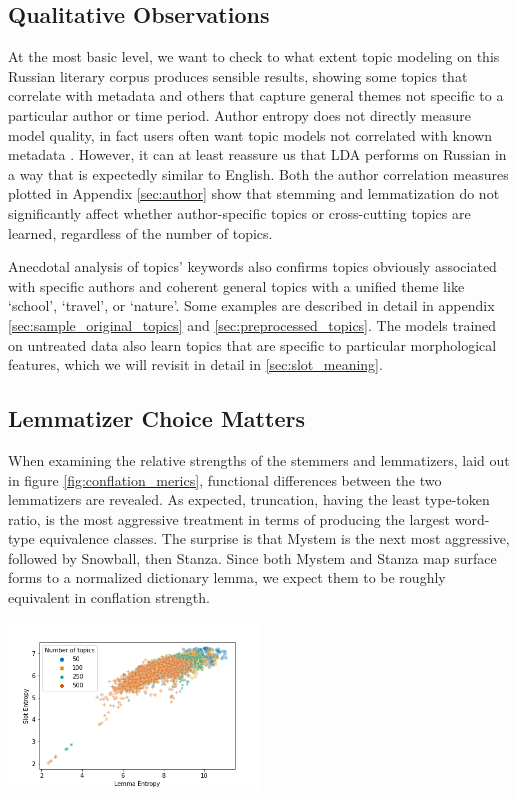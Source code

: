 \documentclass[11pt,a4paper]{article}
\begin{document}
\subsection{Qualitative Observations}
At the most basic level, we want to check to what extent topic modeling on this Russian literary corpus produces sensible results, showing some topics that correlate with metadata and others that capture general themes not specific to a particular author or time period. Author entropy does not directly measure model quality, in fact users often want topic models not correlated with known metadata \cite{Thompson2018AuthorlessTM}. However, it can at least reassure us that LDA performs on Russian in a way that is expectedly similar to English. Both the author correlation measures plotted in Appendix \ref{sec:author} show that stemming and lemmatization do not significantly affect whether author-specific topics or cross-cutting topics are learned, regardless of the number of topics.

Anecdotal analysis of topics' keywords also confirms topics obviously associated with specific authors and coherent general topics with a unified theme like `school', `travel', or `nature'. Some examples are described in detail in appendix \ref{sec:sample_original_topics} and \ref{sec:preprocessed_topics}. The models trained on untreated data also learn topics that are specific to particular morphological features, which we will revisit in detail in \ref{sec:slot_meaning}.

\subsection{Lemmatizer Choice Matters}
When examining the relative strengths of the stemmers and lemmatizers, laid out in figure \ref{fig:conflation_merics}, functional differences between the two lemmatizers are revealed. As expected, truncation, having the least type-token ratio, is the most aggressive treatment in terms of producing the largest word-type equivalence classes. The surprise is that Mystem is the next most aggressive, followed by Snowball, then Stanza. Since both Mystem and Stanza map surface forms to a normalized dictionary lemma, we expect them to be roughly equivalent in conflation strength.


\begin{center}
    \includegraphics[width=0.5\textwidth]{lemma_slot_entropy_scatter.png}
    \label{fig:lemma_vs_slot_entropy}
\end{center}
\end{document}
